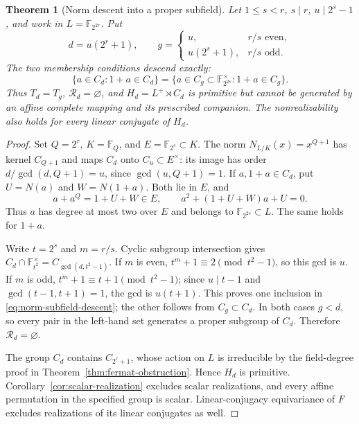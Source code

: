 \documentclass[11pt]{article}
\newtheorem{theorem}{Theorem}[section]
\begin{document}
\begin{theorem}[Norm descent into a proper subfield]
\label{thm:norm-subfield-descent}
Let $1\le s<r$, $s\mid r$, $u\mid2^s-1$, and work in
$L=\mathbb F_{2^{2r}}$. Put
\[
 d=u(2^r+1),\qquad
 g=\begin{cases}
     u,&r/s\text{ even},\\
     u(2^s+1),&r/s\text{ odd}.
   \end{cases}
\]
The two membership conditions descend exactly:
\begin{equation}\label{eq:norm-subfield-descent}
 \{a\in C_d:1+a\in C_d\}
 =\{a\in C_g\subset\mathbb F_{2^{2s}}^\times:1+a\in C_g\}.
\end{equation}
Thus $T_d=T_g$, $\mathcal R_d=\varnothing$, and
$H_d=L^+\rtimes C_d$ is primitive but cannot be generated by an
affine complete mapping and its prescribed companion.
The nonrealizability also holds for every linear conjugate of $H_d$.
\end{theorem}
\begin{proof}
Set $Q=2^r$, $K=\mathbb F_Q$, and $E=\mathbb F_{2^s}\subset K$.
The norm $N_{L/K}(x)=x^{Q+1}$ has kernel $C_{Q+1}$ and maps $C_d$
onto $C_u\subset E^\times$: its image has order
$d/\gcd(d,Q+1)=u$, since $\gcd(u,Q+1)=1$.
If $a,1+a\in C_d$, put $U=N(a)$ and $W=N(1+a)$. Both lie in $E$, and
\[
 a+a^Q=1+U+W\in E,\qquad
 a^2+(1+U+W)a+U=0.
\]
Thus $a$ has degree at most two over $E$ and belongs to
$\mathbb F_{2^{2s}}\subset L$. The same holds for $1+a$.

Write $t=2^s$ and $m=r/s$. Cyclic subgroup intersection gives
$C_d\cap\mathbb F_{t^2}^\times=C_{\gcd(d,t^2-1)}$.
If $m$ is even, $t^m+1\equiv2\pmod{t^2-1}$, so this gcd is $u$.
If $m$ is odd, $t^m+1\equiv t+1\pmod{t^2-1}$; since
$u\mid t-1$ and $\gcd(t-1,t+1)=1$, the gcd is $u(t+1)$.
This proves one inclusion in \eqref{eq:norm-subfield-descent};
the other follows from $C_g\subset C_d$.
In both cases $g<d$, so every pair in the left-hand set generates
a proper subgroup of $C_d$. Therefore $\mathcal R_d=\varnothing$.

The group $C_d$ contains $C_{2^r+1}$, whose action on $L$ is irreducible
by the field-degree proof in Theorem~\ref{thm:fermat-obstruction}.
Hence $H_d$ is primitive. Corollary~\ref{cor:scalar-realization}
excludes scalar realizations, and every affine permutation in the
specified group is scalar. Linear-conjugacy equivariance of $F$
excludes realizations of its linear conjugates as well.
\end{proof}
\end{document}
